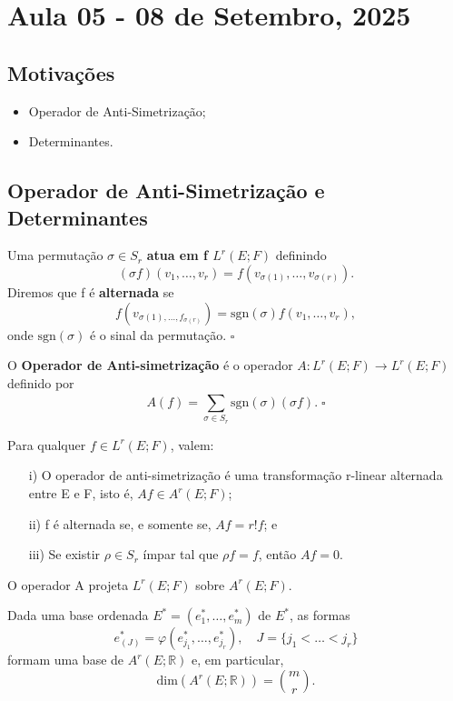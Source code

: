 \documentclass[../differential_forms.tex]{subfiles}
\begin{document}
\section{Aula 05 - 08 de Setembro, 2025}
\subsection{Motivações}
\begin{itemize}
	\item Operador de Anti-Simetrização;
	\item Determinantes.
\end{itemize}
\subsection{Operador de Anti-Simetrização e Determinantes}
\begin{def*}
	Uma permutação \(\sigma \in S_r\) \textbf{atua em f \(L^{r}(E; F)\)} definindo
	\[
		(\sigma f)(v_1,\dotsc ,v_r) = f(v_{\sigma (1)}, \dotsc , v_{\sigma (r)}).
	\]
	Diremos que f é \textbf{alternada} se
	\[
		f(v_{\sigma (1),\dotsc , f_{\sigma (r)}})= \mathrm{sgn}(\sigma )f(v_1,\dotsc ,v_r),
	\]
	onde \(\mathrm{sgn}(\sigma )\) é o sinal da permutação. \(\square\)
\end{def*}
\begin{def*}
	O \textbf{Operador de Anti-simetrização} é o operador \(A:L^{r}(E; F)\rightarrow L^{r}(E; F)\) definido por
	\[
		A(f)= \sum\limits_{\sigma \in S_r}^{} \mathrm{sgn}(\sigma )(\sigma f). \; \square
	\]
\end{def*}
\begin{prop*}
	Para qualquer \(f\in L^{r}(E; F)\), valem:
	\begin{itemize}
		\item[i)] O operador de anti-simetrização é uma transformação r-linear alternada entre E e F, isto é, \(Af\in A^{r}(E; F)\);
		\item[ii)] f é alternada se, e somente se, \(Af=r!f\); e
		\item[iii)] Se existir \(\rho \in S_r\) ímpar tal que \(\rho f = f\), então \(Af=0\).
	\end{itemize}
\end{prop*}
\begin{crl*}
	O operador A projeta \(L^{r}(E; F)\) sobre \(A^{r}(E; F)\).
\end{crl*}
\begin{prop*}
	Dada uma base ordenada \(E^{*}=(e_{1}^{*}, \dotsc , e_{m}^{*})\) de \(E^{*}\), as formas
	\[
		e_{(J)}^{*}=\varphi (e_{j_1}^{*}, \dotsc , e_{j_r}^{*}), \quad J = \{j_1<\dotsc <j_r\}
	\]
	formam uma base de \(A^{r}(E; \mathbb{R})\) e, em particular,
	\[
		\mathrm{dim}(A^{r}(E; \mathbb{R}))= \binom{m}{r}.
	\]
\end{prop*}
\end{document}
